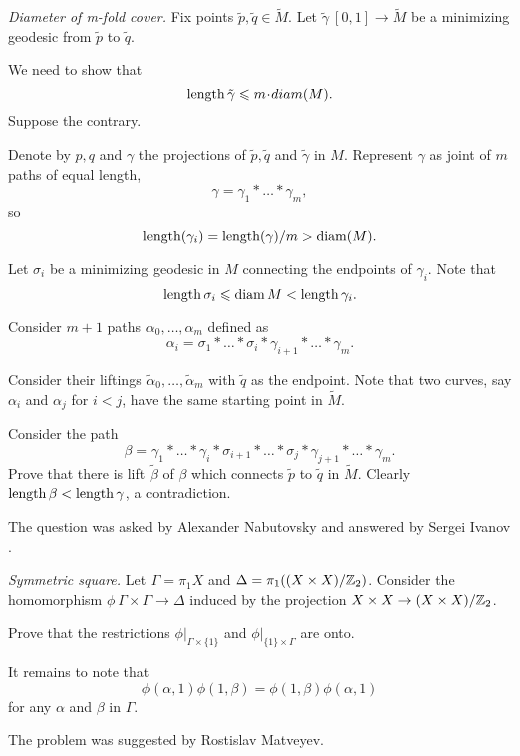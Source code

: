 \textit{Diameter of \textit{m}-fold cover.}
Fix points $\tilde p,\tilde q\in\tilde M$.
Let  
$\tilde\gamma\:[0,1]\to \tilde M$ be a minimizing geodesic from $\tilde p$ to $\tilde q$. 

We need to show that 
\[\length \tilde\gamma\le m\cdot diam(M).\]
Suppose the contrary.

Denote by $p,q$ and $\gamma$ the projections of $\tilde p,\tilde q$ and $\tilde \gamma$ in $M$. 
Represent $\gamma$
as joint of $m$ paths of equal length,
\[\gamma=\gamma_1{*}\dots{*}\gamma_m,\] 
so
\[\operatorname{\rm length}(\gamma_i)=\operatorname{\rm length}(\gamma)/m>\operatorname{\rm diam}(M).\] 

Let $\sigma_i$ be a minimizing geodesic in $M$ connecting the endpoints of $\gamma_i$. 
Note that 
\[\operatorname{\rm length}\sigma_i\leqslant \operatorname{\rm diam} M< \operatorname{\rm length}\gamma_i.\] 

Consider $m+1$ paths $\alpha_0,\dots,\alpha_m$ defined as 
\[\alpha_i=\sigma_1{*}\dots{*}\sigma_i{*}\gamma_{i+1}{*}\dots{*}\gamma_m.\]

Consider their liftings $\tilde\alpha_0,\dots,\tilde\alpha_m$ 
with $\tilde q$ as the endpoint.
Note that two curves, say $\alpha_i$ and $\alpha_j$ for $i<j$, 
have the same starting point in $\tilde M$.

Consider the path
\[\beta=\gamma_1{*}\dots{*}\gamma_i{*}\sigma_{i+1}{*}\dots{*}\sigma_j{*}\gamma_{j+1}{*}\dots{*}\gamma_m.\]
Prove that there is lift $\tilde\beta$ of $\beta$ 
which connects $\tilde p$ to $\tilde q$ in $\tilde M$.
Clearly $\operatorname{\rm length} \beta<\operatorname{\rm length} \gamma$, a contradiction.

The question was asked by Alexander  Nabutovsky
and answered by Sergei Ivanov \cite[see][]{ivanov}.



\textit{Symmetric square.}
Let $\Gamma=\pi_1 X$ and $\Delta=\pi_1((X\times X)/\mathbb{Z}_2)$.
Consider the homomorphism $\phi\:\Gamma\times \Gamma\to \Delta$
induced by the projection $X\times X\to (X\times X)/\mathbb{Z}_2$.

Prove that the restrictions $\phi|_{\Gamma\times \{1\}}$ and $\phi|_{\{1\}\times\Gamma}$
are onto.

It remains to note that 
$$\phi(\alpha,1)\phi(1,\beta)=\phi(1,\beta)\phi(\alpha,1)$$
for any $\alpha$ and $\beta$ in $\Gamma$.

The problem was suggested by Rostislav Matveyev.



